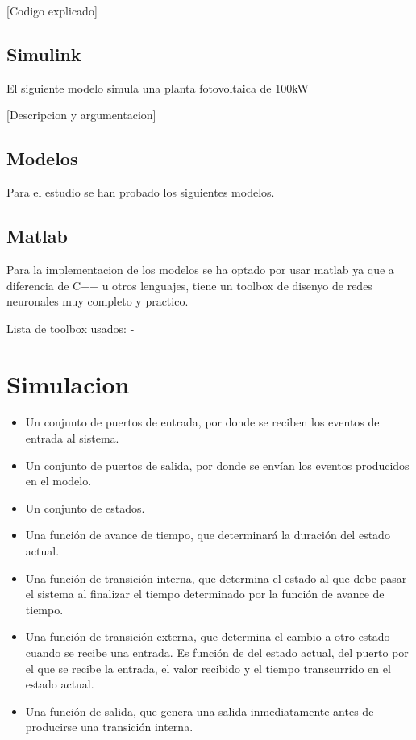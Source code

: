 [Codigo explicado]



\subsection{Simulink} %
\label{sub:Simulink}

El siguiente modelo simula una planta fotovoltaica de 100kW

[Descripcion y argumentacion]


\subsection{Modelos} %
\label{sub:Modelos}

Para el estudio se han probado los siguientes modelos.


\subsection{Matlab} %
\label{sub:Matlab} 

Para la implementacion de los modelos se ha optado por usar matlab ya que a diferencia de C++ u otros lenguajes, tiene un toolbox de disenyo de redes neuronales muy completo y practico.

Lista de toolbox usados:
- 







\section{Simulacion} %
\label{sec:simulacion}

\begin{itemize}
\item Un conjunto de puertos de entrada, por donde se reciben los eventos de entrada al sistema.
\item Un conjunto de puertos de salida, por donde se envían los eventos producidos en el modelo.
\item Un conjunto de estados.
\item Una función de avance de tiempo, que determinará la duración del estado actual.
\item Una función de transición interna, que determina el estado al que debe pasar el sistema al finalizar el tiempo determinado por la función de avance de tiempo.
\item Una función de transición externa, que determina el cambio a otro estado cuando se recibe una entrada. Es función de del estado actual, del puerto por el que se recibe la entrada, el valor recibido y el tiempo transcurrido en el estado actual.
\item Una función de salida, que genera una salida inmediatamente antes de producirse una transición interna.
\end{itemize}

